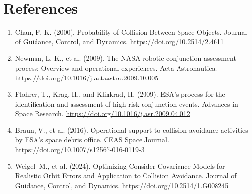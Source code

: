 \documentclass[11pt]{article}
\begin{document}
\section*{References}
\begin{enumerate}
\item Chan, F. K. (2000). Probability of Collision Between Space Objects. Journal of Guidance, Control, and Dynamics. \url{https://doi.org/10.2514/2.4611}
\item Newman, L. K., et al. (2009). The NASA robotic conjunction assessment process: Overview and operational experiences. Acta Astronautica. \url{https://doi.org/10.1016/j.actaastro.2009.10.005}
\item Flohrer, T., Krag, H., and Klinkrad, H. (2009). ESA's process for the identification and assessment of high-risk conjunction events. Advances in Space Research. \url{https://doi.org/10.1016/j.asr.2009.04.012}
\item Braun, V., et al. (2016). Operational support to collision avoidance activities by ESA's space debris office. CEAS Space Journal. \url{https://doi.org/10.1007/s12567-016-0119-3}
\item Weigel, M., et al. (2024). Optimizing Consider-Covariance Models for Realistic Orbit Errors and Application to Collision Avoidance. Journal of Guidance, Control, and Dynamics. \url{https://doi.org/10.2514/1.G008245}
\end{enumerate}
\end{document}
